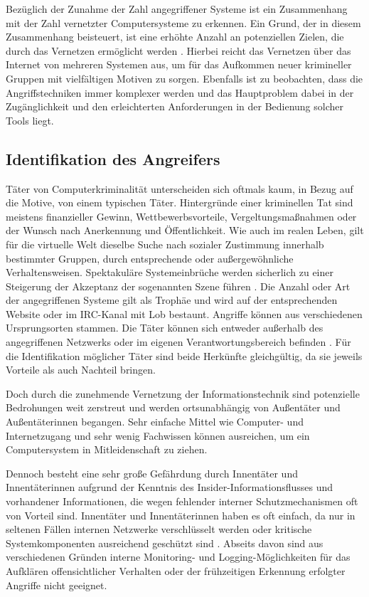 \documentclass[12pt,DIV=14, version=first, BCOR=10mm,a4paper,twoside,parskip=half-,headsepline,headinclude]{scrartcl}
\begin{document}
    Bezüglich der Zunahme der Zahl angegriffener Systeme ist ein Zusammenhang mit der Zahl vernetzter Computersysteme zu erkennen. Ein Grund, der in diesem Zusammenhang beisteuert, ist eine erhöhte Anzahl an potenziellen Zielen, die durch das Vernetzen ermöglicht werden \cite[vgl. S. 13]{texbook01}.
    Hierbei reicht das Vernetzen über das Internet von mehreren Systemen aus, um für das Aufkommen neuer krimineller Gruppen mit vielfältigen Motiven zu sorgen.
    Ebenfalls ist zu beobachten, dass die Angriffstechniken immer komplexer werden und das Hauptproblem dabei in der Zugänglichkeit und den erleichterten Anforderungen in der Bedienung solcher Tools liegt.

    \subsection{Identifikation des Angreifers}
    Täter von Computerkriminalität unterscheiden sich oftmals kaum, in Bezug auf die Motive, von einem typischen Täter.
    Hintergründe einer kriminellen Tat sind meistens finanzieller Gewinn, Wettbewerbsvorteile, Vergeltungsmaßnahmen oder der Wunsch nach Anerkennung und Öffentlichkeit. Wie auch im realen Leben, gilt für die virtuelle Welt dieselbe Suche nach sozialer Zustimmung innerhalb bestimmter Gruppen, durch entsprechende oder außergewöhnliche Verhaltensweisen. Spektakuläre Systemeinbrüche werden sicherlich zu einer Steigerung der Akzeptanz der sogenannten Szene führen \cite[vgl. S. 17]{texbook01}.
    Die Anzahl oder Art der angegriffenen Systeme gilt als Trophäe und wird auf der entsprechenden Website oder im IRC-Kanal mit Lob bestaunt. Angriffe können aus verschiedenen Ursprungsorten stammen. Die Täter können sich entweder außerhalb des angegriffenen Netzwerks oder im eigenen Verantwortungsbereich befinden \cite[vgl. S.  29]{BSI-leitfaden2011}. Für die Identifikation möglicher Täter sind beide Herkünfte gleichgültig, da sie jeweils Vorteile als auch Nachteil bringen. 
    
    Doch durch die zunehmende Vernetzung der Informationstechnik sind potenzielle Bedrohungen weit zerstreut und werden ortsunabhängig von Außentäter und Außentäterinnen begangen. Sehr einfache Mittel wie Computer- und Internetzugang und sehr wenig Fachwissen können ausreichen, um ein Computersystem in Mitleidenschaft zu ziehen.
    
    Dennoch besteht eine sehr große Gefährdung durch Innentäter und Innentäterinnen aufgrund der Kenntnis des Insider-Informationsflusses und vorhandener Informationen, die wegen fehlender interner Schutzmechanismen oft von Vorteil sind. Innentäter und Innentäterinnen haben es oft einfach, da nur in seltenen Fällen internen Netzwerke verschlüsselt werden oder kritische Systemkomponenten ausreichend geschützt sind \cite[vgl. S. 29]{texbook01}. Abseits davon sind aus verschiedenen Gründen interne Monitoring- und Logging-Möglichkeiten für das Aufklären offensichtlicher Verhalten oder der frühzeitigen Erkennung erfolgter Angriffe nicht geeignet.
\end{document}
